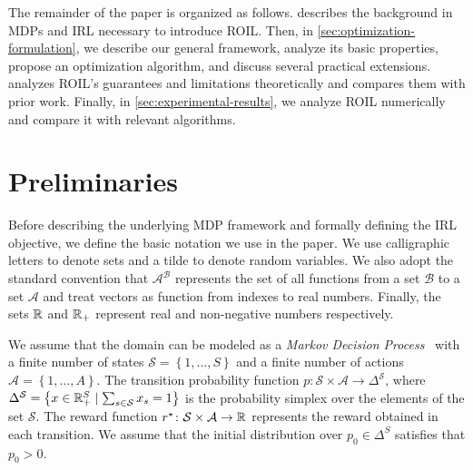 \documentclass[10pt]{article}
\renewcommand{\cite}{\citep}
\theoremstyle{plain}
\theoremstyle{remark}
\begin{document}
The remainder of the paper is organized as follows.  describes the background in MDPs and IRL necessary to introduce ROIL. Then, in \cref{sec:optimization-formulation}, we describe our general framework, analyze its basic properties, propose an optimization algorithm, and discuss several practical extensions.  analyzes ROIL's guarantees and limitations theoretically and compares them with prior work. Finally, in \cref{sec:experimental-results}, we analyze ROIL numerically and compare it with relevant algorithms. 

\section{Preliminaries}\label{sec:preliminaries}

Before describing the underlying MDP framework and formally defining the IRL objective, we define the basic notation we use in the paper. We use calligraphic letters to denote sets and a tilde to denote random variables. We also adopt the standard convention that $\mathcal{A}^{\mathcal{B}}$ represents the set of all functions from a set $\mathcal{B}$ to a set $\mathcal{A}$ and treat vectors as function from indexes to real numbers. Finally, the sets $\mathbb{R}$ and $\mathbb{R}_+$ represent real and non-negative numbers respectively. 




We assume that the domain can be modeled as a \emph{Markov Decision Process}~\cite{Puterman1994} with a finite number of states $\mathcal{S} = \left\{ 1, \dots , S \right\}$ and a finite number of actions $\mathcal{A} = \left\{ 1, \dots , A \right\}$. The transition probability function $p\colon \mathcal{S} \times \mathcal{A} \to \Delta^{\mathcal{S}}$, where $\Delta^{\mathcal{S}} = \left\{ x\in \mathbb{R}_{+}^S \mid \sum_{s\in \mathcal{S}} x_s =1 \right\}$ is the probability simplex over the elements of the set $\mathcal{S}$. The reward function $r^{\mathnormal{\star}} \colon \mathcal{S} \times \mathcal{A} \to \mathbb{R}$ represents the reward obtained in each transition. We assume that the initial distribution over $p_0\in \Delta^S$ satisfies that $p_0 > 0$.
\end{document}
